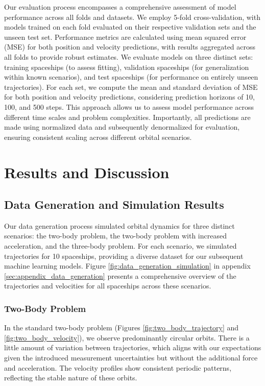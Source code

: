 \documentclass[11pt,a4paper, twocolumn]{article}
\begin{document}
Our evaluation process encompasses a comprehensive assessment of model performance across all folds and datasets. We employ 5-fold cross-validation, with models trained on each fold evaluated on their respective validation sets and the unseen test set. Performance metrics are calculated using mean squared error (MSE) for both position and velocity predictions, with results aggregated across all folds to provide robust estimates. We evaluate models on three distinct sets: training spaceships (to assess fitting), validation spaceships (for generalization within known scenarios), and test spaceships (for performance on entirely unseen trajectories). For each set, we compute the mean and standard deviation of MSE for both position and velocity predictions, considering prediction horizons of 10, 100, and 500 steps. This approach allows us to assess model performance across different time scales and problem complexities. Importantly, all predictions are made using normalized data and subsequently denormalized for evaluation, ensuring consistent scaling across different orbital scenarios.

\section{Results and Discussion}
\label{sec:results}

\subsection{Data Generation and Simulation Results}

Our data generation process simulated orbital dynamics for three distinct scenarios: the two-body problem, the two-body problem with increased acceleration, and the three-body problem. For each scenario, we simulated trajectories for 10 spaceships, providing a diverse dataset for our subsequent machine learning models. Figure \ref{fig:data_generation_simulation} in appendix \ref{sec:appendix_data_generation} presents a comprehensive overview of the trajectories and velocities for all spaceships across these scenarios.

\subsubsection{Two-Body Problem}
In the standard two-body problem (Figures \ref{fig:two_body_trajectory} and \ref{fig:two_body_velocity}), we observe predominantly circular orbits. There is a little amount of variation between trajectories, which aligns with our expectations given the introduced measurement uncertainties but without the additional force and acceleration. The velocity profiles show consistent periodic patterns, reflecting the stable nature of these orbits.
\end{document}
